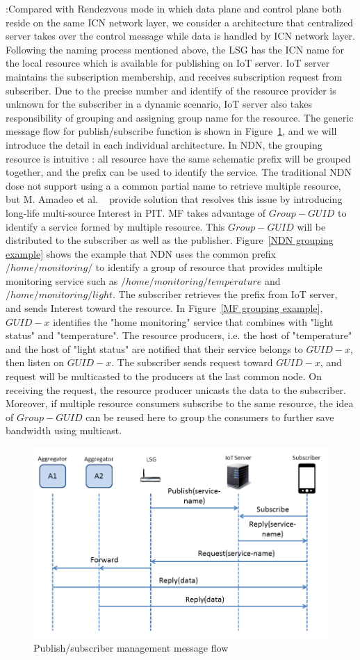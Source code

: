\vspace{1mm}:Compared with Rendezvous mode in which data plane and control plane both reside on the same ICN network layer, we consider a architecture that centralized server takes over the control message while data is handled by ICN network layer. Following the naming process mentioned above, the LSG has the ICN name for the local resource which is available for publishing on IoT server. IoT server maintains the subscription membership, and receives subscription request from subscriber. Due to the precise number and identify of the resource provider is unknown for the subscriber in a dynamic scenario, IoT server also takes responsibility of grouping and assigning group name for the resource. The generic message flow for publish/subscribe function is shown in Figure~\ref{fig:pubsub}, and we will introduce the detail in each individual architecture.
In NDN, the grouping resource is intuitive : all resource have the same schematic prefix will be grouped together, and the prefix can be used to identify the service. The traditional NDN dose not support using a a common partial name to retrieve multiple resource, but M. Amadeo et al. ~\cite{**Multi-source paper**} provide solution that resolves this issue by introducing long-life multi-source Interest in PIT.
MF takes advantage of  $Group-GUID$ to identify a service formed by multiple resource. This $Group-GUID$ will be distributed to the subscriber as well as the publisher. Figure~\ref{NDN grouping example} shows the example that NDN uses the common prefix$/home/monitoring/$ to identify a group of resource that provides multiple monitoring service such as $/home/monitoring/temperature$ and $/home/monitoring/light$. The subscriber retrieves the prefix from IoT server, and sends Interest toward the resource. In Figure~\ref{MF grouping example}, $GUID-x$ identifies the "home monitoring" service that combines with "light status" and "temperature". The resource producers, i.e. the host of "temperature" and the host of "light status" are notified that their service belongs to $GUID-x$, then listen on $GUID-x$. The subscriber sends request toward  $GUID-x$, and request will be multicasted to the producers at the last common node. On receiving the request, the resource producer unicasts the data to the subscriber. Moreover, if multiple resource consumers subscribe to the same resource,
the idea of $Group-GUID$ can be reused here to group the consumers to further save bandwidth using multicast.
\begin{figure}
\includegraphics[width=\columnwidth]{figure/pub_sub.png}
\caption{\label{fig:pubsub}Publish/subscriber management message flow}
\end{figure}
